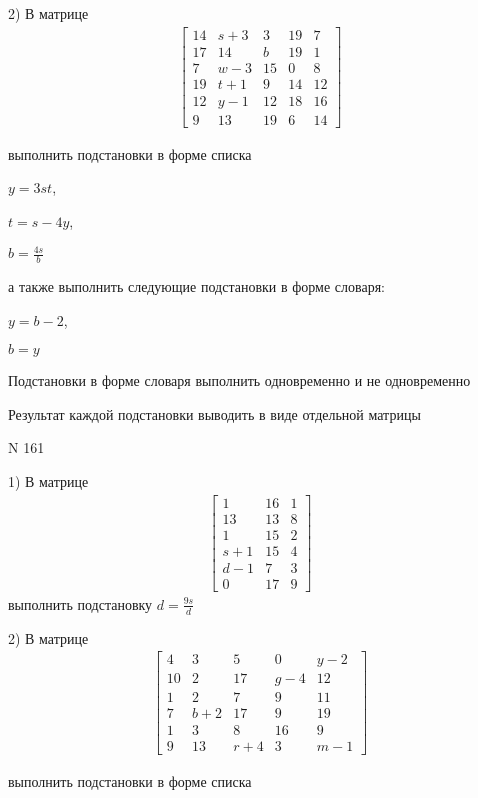 \documentclass[11pt]{report}
\begin{document}
    2) В матрице
\begin{align*}
\left[\begin{matrix}14 & s + 3 & 3 & 19 & 7\\17 & 14 & b & 19 & 1\\7 & w - 3 & 15 & 0 & 8\\19 & t + 1 & 9 & 14 & 12\\12 & y - 1 & 12 & 18 & 16\\9 & 13 & 19 & 6 & 14\end{matrix}\right]
\end{align*}

выполнить подстановки в форме списка

$y=3 s t$,

$t=s - 4 y$,

$b=\frac{4 s}{b}$

а также выполнить следующие подстановки в форме словаря:

$y=b - 2$,

$b=y$


    Подстановки в форме словаря выполнить одновременно и не одновременно


    Результат каждой подстановки выводить в виде отдельной матрицы

\newpage
N 161


    1) В матрице
\begin{align*}
\left[\begin{matrix}1 & 16 & 1\\13 & 13 & 8\\1 & 15 & 2\\s + 1 & 15 & 4\\d - 1 & 7 & 3\\0 & 17 & 9\end{matrix}\right]
\end{align*}
выполнить подстановку $d=\frac{9 s}{d}$


    2) В матрице
\begin{align*}
\left[\begin{matrix}4 & 3 & 5 & 0 & y - 2\\10 & 2 & 17 & g - 4 & 12\\1 & 2 & 7 & 9 & 11\\7 & b + 2 & 17 & 9 & 19\\1 & 3 & 8 & 16 & 9\\9 & 13 & r + 4 & 3 & m - 1\end{matrix}\right]
\end{align*}

выполнить подстановки в форме списка
\end{document}
